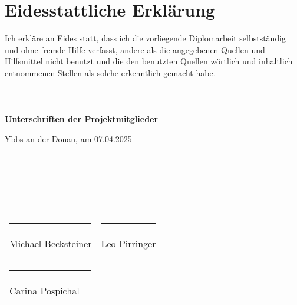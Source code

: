 \chapter*{Eidesstattliche Erklärung} 

Ich erkläre an Eides statt, dass ich die vorliegende Diplomarbeit selbstständig und ohne fremde Hilfe verfasst, 
andere als die angegebenen Quellen und Hilfsmittel nicht benutzt und die den benutzten Quellen wörtlich und inhaltlich entnommenen Stellen 
als solche erkenntlich gemacht habe.
\\\\\\\\

\textbf{Unterschriften der Projektmitglieder}

Ybbs an der Donau, am 07.04.2025
\\\\\\\\\\\\

\begin{table}[ht]
  \begin{tabular}{p{8cm} p{8cm}}
    \rule{6cm}{0.01cm} & \rule{6cm}{0.01cm}\\
    Michael Becksteiner & Leo Pirringer\\
    \\
    \\
    \rule{6cm}{0.01cm}\\
    Carina Pospichal
  \end{tabular}
\end{table}